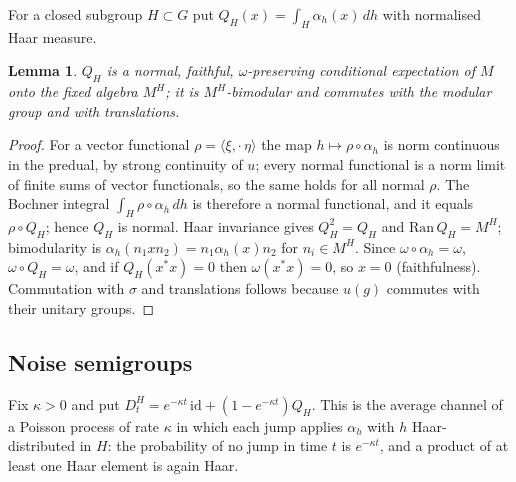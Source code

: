 \documentclass[12pt]{article}
\newtheorem{lemma}[theorem]{Lemma}
\theoremstyle{definition}
\theoremstyle{remark}
\begin{document}
For a closed subgroup \(H\subset G\) put \(Q_H(x)=\int_H\alpha_h(x)\,dh\) with normalised Haar measure.

\begin{lemma}\label{lem:Q}
\(Q_H\) is a normal, faithful, \(\omega\)-preserving conditional expectation of \(M\)
onto the fixed algebra \(M^H\); it is \(M^H\)-bimodular and commutes with the modular
group and with translations.
\end{lemma}
\begin{proof}
For a vector functional \(\rho=\langle\xi,\cdot\,\eta\rangle\) the map
\(h\mapsto\rho\circ\alpha_h\) is norm continuous in the predual, by strong continuity
of \(u\); every normal functional is a norm limit of finite sums of vector
functionals, so the same holds for all normal \(\rho\). The Bochner integral
\(\int_H\rho\circ\alpha_h\,dh\) is therefore a normal functional, and it equals
\(\rho\circ Q_H\); hence \(Q_H\) is normal. Haar invariance gives
\(Q_H^2=Q_H\) and \(\mathrm{Ran}\,Q_H=M^H\); bimodularity is
\(\alpha_h(n_1xn_2)=n_1\alpha_h(x)n_2\) for \(n_i\in M^H\). Since
\(\omega\circ\alpha_h=\omega\), \(\omega\circ Q_H=\omega\), and if \(Q_H(x^*x)=0\)
then \(\omega(x^*x)=0\), so \(x=0\) (faithfulness). Commutation with \(\sigma\) and
translations follows because \(u(g)\) commutes with their unitary groups.
\end{proof}

\subsection{Noise semigroups}

Fix \(\kappa>0\) and put \(D_t^H=e^{-\kappa t}\,\mathrm{id}+(1-e^{-\kappa t})Q_H\).
This is the average channel of a Poisson process of rate \(\kappa\) in which each
jump applies \(\alpha_h\) with \(h\) Haar-distributed in \(H\): the probability of no
jump in time \(t\) is \(e^{-\kappa t}\), and a product of at least one Haar element is
again Haar.
\end{document}
